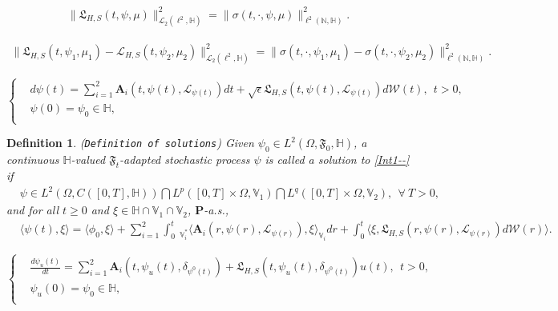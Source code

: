 \documentclass[10pt,a4paper]{amsart}
\newtheorem{definition}{Definition}
\renewcommand{\geq}{\geqslant}  %
\begin{document}
\begin{align}\label{ffnewA2a0}
\|\mathfrak{L}_{H,S}(t,\psi,\mu)
\|^2_{\mathcal{L}_2(\ell^2
,\mathbb{H})}
 =\|\sigma(t,\cdot,\psi,\mu)
\|^2_{
\ell^2(\mathbb{N},
\mathbb{H})}.
\end{align}

\begin{align}\label{h2----0}
\|\mathfrak{L}_{H,S}(t,\psi_1,\mu_1)-
\mathcal{L}_{H,S}(t,\psi_2,\mu_2)
\|^2_{\mathcal{L}_2(\ell^2
,\mathbb{H})}=\|\sigma(t,\cdot,\psi_1,
\mu_1)-
\sigma(t,\cdot,\psi_2,\mu_2)
\|^2_{
\ell^2(\mathbb{N},
\mathbb{H})}.
\end{align}

\begin{equation}\label{Int1--}
\left\{
  \begin{aligned}
  &d \psi(t)
=\sum_{i=1}^2\textbf{A}_i(t,\psi(t),\mathcal{L}_{
\psi(t)})dt
+ \sqrt{\epsilon}\mathfrak{L}_{H,S}(t,\psi(t),
\mathcal{L}_{
\psi(t)})d\mathcal{W}(t), \ \ t>0, \\
  &\psi(0)=\psi_0\in \mathbb{H},\\
  \end{aligned}
\right.
\end{equation}

\begin{definition}\label{Defsolutionsolution}
(\texttt{Definition of solutions}) Given
$\psi_0\in L^2(\Omega,\mathfrak{F}_0, \mathbb{H})$, a continuous $\mathbb{H}$-valued
$\mathfrak{F}_t$-adapted stochastic process $\psi$
is called a solution to \eqref{Int1--}
if
\begin{align}&\label{Defsolution0}\psi
 \in L^2(\Omega, C([0,T],\mathbb{H} ))\bigcap L^p([0,T]\times\Omega, \mathbb{V}_1)\bigcap L^q([0,T]\times\Omega, \mathbb{V}_2  ),\ \ \forall\ T>0,
\end{align}
and for all $t\geq0$ and $\xi\in\mathbb{H}\cap\mathbb{V}_1
\cap\mathbb{V}_2$, $\mathbf{P}$-a.s.,
\begin{align}\label{Defsolution1}
&\langle \psi(t) ,\xi\rangle=\langle \phi_0 ,\xi\rangle+\sum_{i=1}^2
 \int_{0}^t\ _{\mathbb{V}_i^*}\big\langle \mathbf{A}_i(r,\psi(r),\mathcal{L}_{
\psi(r)}),
\xi\big  \rangle_{\mathbb{V}_i}        dr
 +\int_{0}^t
 \big\langle \xi, \mathfrak{L}_{H,S}(r,\psi(r),\mathcal{L}_{
\psi(r)})d\mathcal{W}(r) \big\rangle.
\end{align}
\end{definition}

\begin{equation}\label{Int1--++}
\left\{
  \begin{aligned}
  &\frac{d \psi_u(t)}{dt}
=\sum_{i=1}^2\textbf{A}_i(t,\psi_u(t),\delta_{\psi^0(t)})
+ \mathfrak{L}_{H,S}(t,\psi_u(t),
\delta_{\psi^0(t)})u(t), \ \ t>0, \\
  &\psi_u(0)=\psi_0\in \mathbb{H},\\
  \end{aligned}
\right.
\end{equation}
\end{document}
